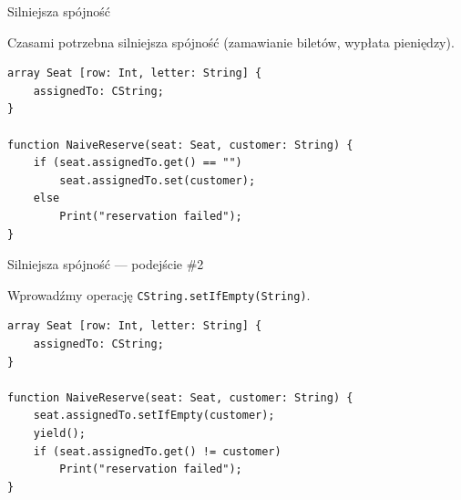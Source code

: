\documentclass{beamer}
\begin{document}
\begin{frame}[fragile]{Silniejsza spójność}
    \begin{card}
        Czasami potrzebna silniejsza spójność (zamawianie biletów, wypłata pieniędzy).
    \end{card}
    \begin{card}
        \begin{lstlisting}
array Seat [row: Int, letter: String] {
    assignedTo: CString;
}

function NaiveReserve(seat: Seat, customer: String) {
    if (seat.assignedTo.get() == "")
        seat.assignedTo.set(customer);
    else
        Print("reservation failed");
}
        \end{lstlisting}
    \end{card}
\end{frame}

\begin{frame}[fragile]{Silniejsza spójność --- podejście \#2}
    \begin{card}
        Wprowadźmy operację \texttt{CString.setIfEmpty(String)}.
    \end{card}
    \begin{card}[Lepiej?]
        \begin{lstlisting}
array Seat [row: Int, letter: String] {
    assignedTo: CString;
}

function NaiveReserve(seat: Seat, customer: String) {
    seat.assignedTo.setIfEmpty(customer);
    yield();
    if (seat.assignedTo.get() != customer)
        Print("reservation failed");
}
        \end{lstlisting}
    \end{card}
\end{frame}
\end{document}
